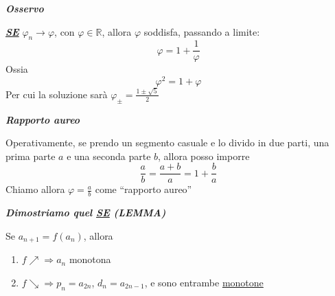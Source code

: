 \documentclass{article}
\theoremstyle{definition}
\newcommand{\virgolette}[1]{``#1''}
\begin{document}
    \begin{center}
        \textbf{\textit{Osservo}}
    \end{center}
\underline{\textbf{\textit{SE}}} $\varphi_n \to \varphi$, con $\varphi \in \mathbb{R}$, allora $\varphi$ soddisfa, passando a limite:
\begin{equation}
    \varphi=1+\frac{1}{\varphi}
\end{equation}
Ossia
\begin{equation}
    \varphi^2=1+\varphi
\end{equation}
Per cui la soluzione sarà $\varphi_{\pm}=\frac{1 \pm \sqrt{5}}{2}$
\begin{center}
    \textbf{\textit{Rapporto aureo}}
\end{center}
Operativamente, se prendo un segmento casuale e lo divido in due parti, una prima parte $a$ e una seconda parte $b$, allora posso imporre
\begin{equation}
    \frac{a}{b}=\frac{a+b}{a}=1+\frac{b}{a}
\end{equation}
Chiamo allora $\varphi=\frac{a}{b}$ come \virgolette{rapporto aureo}
\begin{center}
    \textbf{\textit{Dimostriamo quel \underline{SE} (LEMMA)}}
\end{center}
    Se $a_{n+1}=f(a_n)$, allora
    \begin{enumerate}
        \item $f \nearrow \Rightarrow a_n$ monotona
        \item $f \searrow \Rightarrow p_n=a_{2n}$, $d_n=a_{2n-1}$, e sono entrambe \underline{monotone}
    \end{enumerate}
\end{document}
